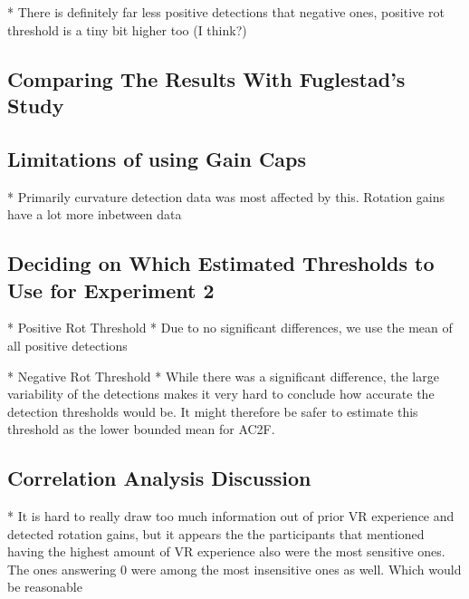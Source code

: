 * There is definitely far less positive detections that negative ones, positive rot threshold is a tiny bit higher too (I think?)

\subsection{Comparing The Results With Fuglestad's Study}

\subsection{Limitations of using Gain Caps}
* Primarily curvature detection data was most affected by this. Rotation gains have a lot more inbetween data

\subsection{Deciding on Which Estimated Thresholds to Use for Experiment 2}
* Positive Rot Threshold
   * Due to no significant differences, we use the mean of all positive detections
   
* Negative Rot Threshold
   * While there was a significant difference, the large variability of the detections makes it very hard to conclude how accurate the detection thresholds would be. It might therefore be safer to estimate this threshold as the lower bounded mean for AC2F.
   
\subsection{Correlation Analysis Discussion}
* It is hard to really draw too much information out of prior VR experience and detected rotation gains, but it appears the the participants that mentioned having the highest amount of VR experience also were the most sensitive ones. The ones answering 0 were among the most insensitive ones as well. Which would be reasonable